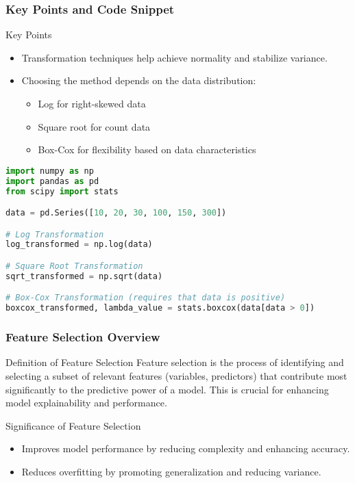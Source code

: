 \documentclass[aspectratio=169]{beamer}
\begin{document}
\begin{frame}[fragile]
    \frametitle{Key Points and Code Snippet}
    \begin{block}{Key Points}
        \begin{itemize}
            \item Transformation techniques help achieve normality and stabilize variance.
            \item Choosing the method depends on the data distribution:
            \begin{itemize}
                \item Log for right-skewed data
                \item Square root for count data
                \item Box-Cox for flexibility based on data characteristics
            \end{itemize}
        \end{itemize}
    \end{block}

    \begin{lstlisting}[language=Python, caption={Example Code for Transformations}]
import numpy as np
import pandas as pd
from scipy import stats

data = pd.Series([10, 20, 30, 100, 150, 300])

# Log Transformation
log_transformed = np.log(data)

# Square Root Transformation
sqrt_transformed = np.sqrt(data)

# Box-Cox Transformation (requires that data is positive)
boxcox_transformed, lambda_value = stats.boxcox(data[data > 0])
    \end{lstlisting}
\end{frame}

\begin{frame}[fragile]
    \frametitle{Feature Selection Overview}
    
    \begin{block}{Definition of Feature Selection}
        Feature selection is the process of identifying and selecting a subset of relevant features (variables, predictors) that contribute most significantly to the predictive power of a model. This is crucial for enhancing model explainability and performance.
    \end{block}
    
    \begin{block}{Significance of Feature Selection}
        \begin{itemize}
            \item Improves model performance by reducing complexity and enhancing accuracy.
            \item Reduces overfitting by promoting generalization and reducing variance.
        \end{itemize}
    \end{block}
\end{frame}
\end{document}

